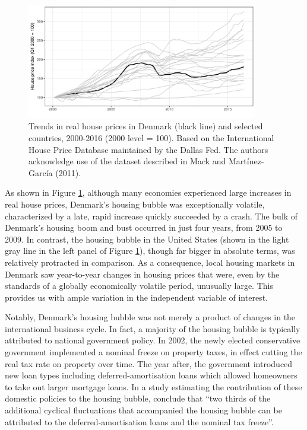\documentclass[12pt,a4paper]{article}
\begin{document}
\begin{figure}[htbp!]
	\includegraphics[width=0.9\textwidth]{../figures/timeplot}
	\centering
	\caption{ Trends in real house prices in Denmark (black line) and selected countries, 2000-2016 (2000 level = 100). Based on the International House Price Database maintained by the Dallas Fed. The authors acknowledge use of the dataset described in Mack and Martínez-García (2011).}\label{hpd}
\end{figure}

As shown in Figure \ref{hpd}, although many economies experienced large increases in real house prices, Denmark's housing bubble was exceptionally volatile, characterized by a late, rapid increase quickly succeeded by a crash. The bulk of Denmark's housing boom and bust occurred in just four years, from 2005 to 2009. In contrast, the housing bubble in the United States (shown in the light gray line in the left panel of Figure \ref{hpd}), though far bigger in absolute terms, was relatively protracted in comparison. As a consequence, local housing markets in Denmark saw year-to-year changes in housing prices that were, even by the standards of a globally economically volatile period, unusually large. This provides us with ample variation in the independent variable of interest.

Notably, Denmark's housing bubble was not merely a product of changes in the international business cycle. In fact, a majority of the housing bubble is typically attributed to national government policy. In 2002, the newly elected conservative government implemented a nominal freeze on property taxes, in effect cutting the real tax rate on property over time. The year after, the government introduced new loan types including deferred-amortisation loans which allowed homeowners to take out larger mortgage loans. In a study estimating the contribution of these domestic policies to the housing bubble, \citet[p. 62]{dam2011housing} conclude that ``two  thirds  of  the  additional  cyclical  fluctuations  that  accompanied  the  housing  bubble  can  be  attributed to the deferred-amortisation loans and the nominal tax freeze''.
\end{document}
